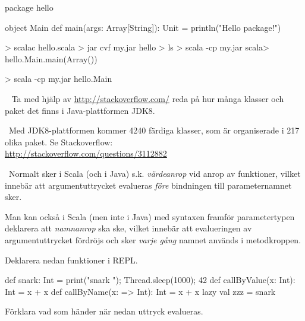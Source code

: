 \SubtaskSolved
\begin{Code}
package hello

object Main {
  def main(args: Array[String]): Unit = println("Hello package!")
}
\end{Code}

\SubtaskSolved
\begin{REPL}
> scalac hello.scala
> jar cvf my.jar hello
> ls
> scala -cp my.jar
scala> hello.Main.main(Array())
\end{REPL}

\SubtaskSolved
\begin{REPL}
> scala -cp my.jar hello.Main
\end{REPL}

\QUESTEND





\QUESTBEGIN

\Task \what~ Ta med hjälp av \url{http://stackoverflow.com/} reda på hur många klasser och paket det finns i Java-plattformen JDK8.

\SOLUTION

\TaskSolved \what~Med JDK8-plattformen kommer 4240 färdiga klasser, som är organiserade i 217 olika paket. Se Stackoverflow: \\\url{http://stackoverflow.com/questions/3112882}

\QUESTEND




\QUESTBEGIN

\Task  \what~Normalt sker i Scala (och i Java) s.k. \emph{värdeanrop} vid anrop av funktioner, vilket innebär att argumentuttrycket evalueras \emph{före} bindningen till parameternamnet sker.

Man kan också i Scala (men inte i Java) med syntaxen \code{=>} framför parametertypen deklarera att \emph{namnanrop} ska ske, vilket innebär att evalueringen av argumentuttrycket fördröjs och sker \emph{varje gång} namnet används i metodkroppen.

Deklarera nedan funktioner i REPL.

\begin{Code}
def snark: Int = { print("snark "); Thread.sleep(1000); 42 }
def callByValue(x: Int):   Int = x + x
def callByName(x: => Int): Int = x + x
lazy val zzz = snark
\end{Code}

\noindent Förklara vad som händer när nedan uttryck evalueras.

